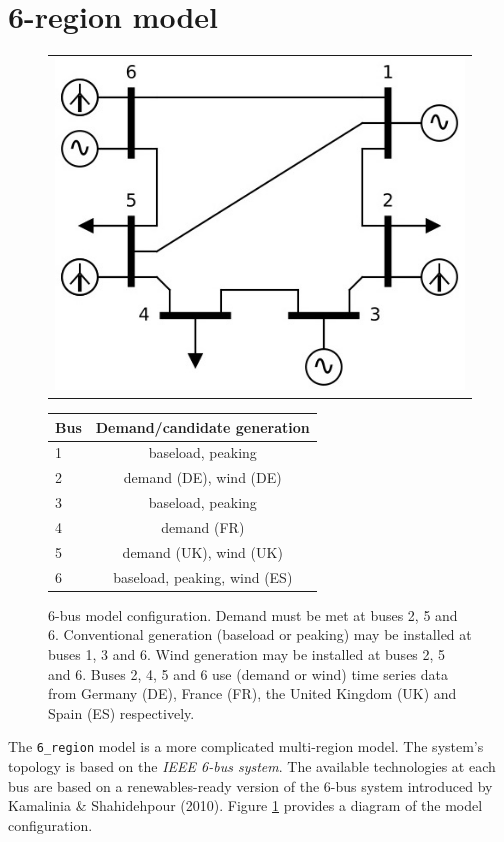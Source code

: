 \documentclass[preprint]{elsarticle}
\begin{document}
\section{6-region model}

\begin{figure}
  \begin{tabular}{c}
    \includegraphics[scale=0.38, trim=0 0 0 0, clip]{6_region_diagram.jpg}
  \end{tabular}
  \begin{tabular}{ l  c}
  Bus & Demand/candidate generation \\ \hline
  1 & baseload, peaking \\
  2 & demand (DE), wind (DE) \\
  3 & baseload, peaking \\
  4 & demand (FR) \\
  5 & demand (UK), wind (UK) \\
  6 & baseload, peaking, wind (ES) \\ \hline
\end{tabular}
  \caption{6-bus model configuration. Demand must be met at buses 2, 5 and 6. Conventional generation (baseload or peaking) may be installed at buses 1, 3 and 6. Wind generation may be installed at buses 2, 5 and 6. Buses 2, 4, 5 and 6 use (demand or wind) time series data from Germany (DE), France (FR), the United Kingdom (UK) and Spain (ES) respectively.}
  \label{fig:model_2:model_diagram}
\end{figure}

\noindent The \texttt{6\_region} model is a more complicated multi-region model. The system's topology is based on the \textit{IEEE 6-bus system}. The available technologies at each bus are based on a renewables-ready version of the 6-bus system introduced by Kamalinia \& Shahidehpour (2010). Figure \ref{fig:model_2:model_diagram} provides a diagram of the model configuration.
\end{document}
